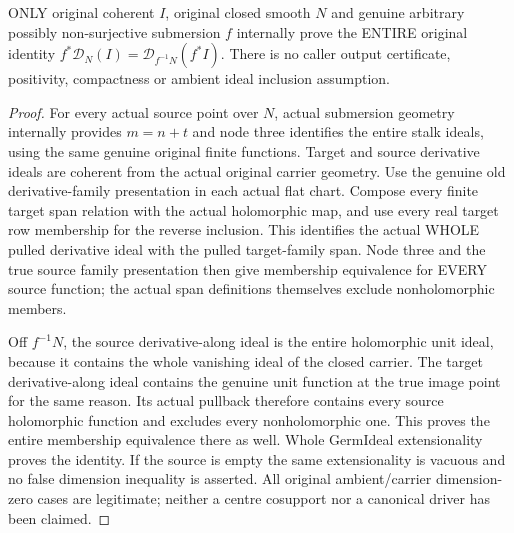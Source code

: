 \begin{theorem}
\label{hir:submersion-relative-differential-whole-one-step}
\leanok
ONLY original coherent $I$, original closed smooth $N$ and genuine arbitrary
possibly non-surjective submersion $f$ internally prove the ENTIRE original
identity
$f^*\mathcal D_N(I)=\mathcal D_{f^{-1}N}(f^*I)$.
There is no caller output certificate, positivity, compactness or ambient
ideal inclusion assumption.
\end{theorem}
\begin{proof}
For every actual source point over $N$, actual submersion geometry internally
provides $m=n+t$ and node three identifies the entire stalk ideals, using the
same genuine original finite functions. Target and source derivative ideals
are coherent from the actual original carrier geometry. Use the genuine old derivative-family presentation in each actual flat
chart. Compose every finite target span relation with the actual holomorphic
map, and use every real target row membership for the reverse inclusion.
This identifies the actual WHOLE pulled derivative ideal with the pulled
target-family span. Node three and the true source family presentation then
give membership equivalence for EVERY source function; the actual span
definitions themselves exclude nonholomorphic members.

Off $f^{-1}N$, the source derivative-along ideal is the entire holomorphic
unit ideal, because it contains the whole vanishing ideal of the closed
carrier. The target derivative-along ideal contains the genuine unit function
at the true image point for the same reason. Its actual pullback therefore
contains every source holomorphic function and excludes every nonholomorphic
one. This proves the entire membership equivalence there as well. Whole
GermIdeal extensionality proves the identity. If the source is empty the
same extensionality is vacuous and no false dimension inequality is asserted.
All original ambient/carrier dimension-zero cases are legitimate; neither a
centre cosupport nor a canonical driver has been claimed.
\end{proof}

